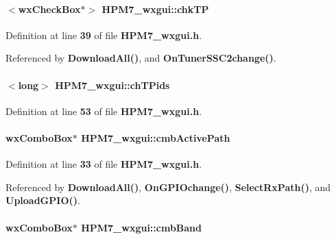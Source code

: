 \paragraph[{chk\+TP}]{$<$wx\+Check\+Box$\ast$$>$ H\+P\+M7\+\_\+wxgui\+::chk\+TP\hspace{0.3cm}{\ttfamily [protected]}}\label{classHPM7__wxgui_ab8d3e6f9336a0606fcd9d244152eb0e6}


Definition at line {\bf 39} of file {\bf H\+P\+M7\+\_\+wxgui.\+h}.



Referenced by {\bf Download\+All()}, and {\bf On\+Tuner\+S\+S\+C2change()}.

\paragraph[{ch\+T\+Pids}]{$<$long$>$ H\+P\+M7\+\_\+wxgui\+::ch\+T\+Pids\hspace{0.3cm}{\ttfamily [private]}}\label{classHPM7__wxgui_a57f45798f9eccdcf350ac3a33d4c9d18}


Definition at line {\bf 53} of file {\bf H\+P\+M7\+\_\+wxgui.\+h}.

\paragraph[{cmb\+Active\+Path}]{\setlength{\rightskip}{0pt plus 5cm}wx\+Combo\+Box$\ast$ H\+P\+M7\+\_\+wxgui\+::cmb\+Active\+Path\hspace{0.3cm}{\ttfamily [protected]}}\label{classHPM7__wxgui_a52f6f7093bc42e0a0b5a1fc4e53b3d9b}


Definition at line {\bf 33} of file {\bf H\+P\+M7\+\_\+wxgui.\+h}.



Referenced by {\bf Download\+All()}, {\bf On\+G\+P\+I\+Ochange()}, {\bf Select\+Rx\+Path()}, and {\bf Upload\+G\+P\+I\+O()}.

\paragraph[{cmb\+Band}]{\setlength{\rightskip}{0pt plus 5cm}wx\+Combo\+Box$\ast$ H\+P\+M7\+\_\+wxgui\+::cmb\+Band\hspace{0.3cm}{\ttfamily [protected]}}\label{classHPM7__wxgui_a7da8ed65a98b8a20fad1c2f17617eb9f}



